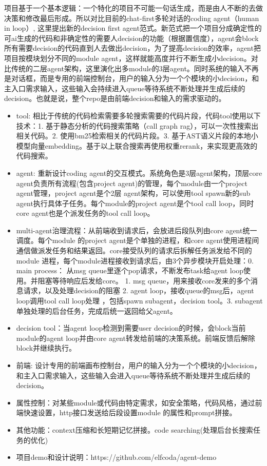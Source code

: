 \documentclass{resume}
\begin{document}
\begin{onehalfspacing}
项目基于一个基本逻辑：一个特化的项目不可能一句话生成，而是由人不断的去做决策和修改最后形成。所以对比目前的chat-first多轮对话的coding agent（human in loop）, 这里提出新的decision first agent范式。新范式把一个项目分成确定性的可ai生成的代码和非确定性的需要人decision的功能（根据置信度），agent会block所有需要decision的代码直到人去做出decision，为了提高decision的效率，agent把项目按模块划分不同的module agent，这样就能高度并行不断生成小decision。对比传统的二层agent架构，这里演化出多module的3层agent。同时系统的输入不再是对话框，而是专用的前端控制台，用户的输入分为一个个模块的小decision，和主入口需求输入，这些输入会持续进入queue等待系统不断处理并生成后续的decision。也就是说，整个repo是由前端decision和输入的需求驱动的。
\begin{itemize}
  \item tool: 相比于传统的代码检索需要多轮搜索需要的代码片段，代码tool使用以下技术：1. 基于静态分析的代码搜索策略（call graph rag），可以一次性搜索出相关代码。2. 使用bm25检索相关的代码片段。3. 基于AST语义片段的本地小模型向量embedding。基于以上联合搜索再使用权重rerank，来实现更高效的代码搜索。
  \item agent: 重新设计coding agent的交互模式。系统角色是3层agent架构，顶层core agent负责所有流程(包含project agent)的管理，每个module由一个project agent管理，project agent是个2层 agent架构，可以使用tool spawn新的sub agent执行具体子任务。每个module的project agent是个tool call loop，同时core agent也是个派发任务的tool call loop。
  \item multi-agent治理流程：从前端收到请求后，会放进后段队列由core agent统一调度。每个module 的project agent是个单独的进程，和core agent使用进程间通信做派发任务和结果返回。core接受队列的请求后拆解任务派发给不同的module 进程，每个module进程接收到请求后，由3个异步模块开启处理：0. main process： 从msg queue里逐个pop请求，不断发布task给agent loop使用。并阻塞等待响应后发给core。 1. msg queue，用来接收core发来的多个消息请求，以及处理decision的阻塞 2. agent loop，接收queue的msg后，agent loop调用tool call loop处理 ，包括spawn subagent，decision tool。3. subagent单独处理的后台任务，完成后统一返回给父agent。
  \item decision tool：当agent loop检测到需要user decision的时候，会block当前module的agent loop并由core agent转发给前端的决策系统。前端反馈后解除block并继续执行。
  \item 前端: 设计专用的前端画布控制台，用户的输入分为一个个模块的小decision，和主入口需求输入，这些输入会进入queue等待系统不断处理并生成后续的decision。
  \item 属性控制：对某些module或代码由特定需求，如安全策略，代码风格，通过前端快速设置，http接口发送给后段设置module 的属性和prompt拼接。
  \item 其他功能：context压缩和长短期记忆拼接。code searching(处理后台长搜索任务的优化)
  \item 项目demo和设计说明：https://github.com/elfcoda/agent-demo

  \end{itemize}
\end{onehalfspacing}
\end{document}
